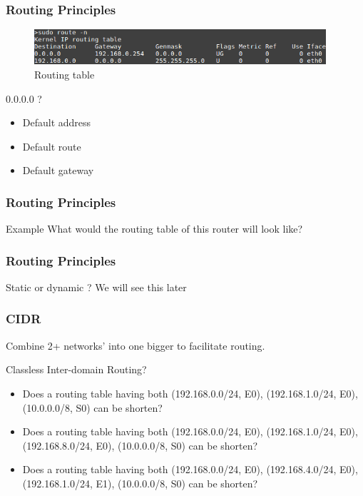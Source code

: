   \begin{frame}
    \frametitle{Routing Principles}
    \begin{figure}[t]
      \centering
      \includegraphics[height=1.3cm]{./imgs/routing-table.png}
      \caption{Routing table}
      \label{fig:routing_table}
    \end{figure}
    \begin{block}{0.0.0.0 ?}
      \begin{itemize}
        \item Default address
        \item Default route
        \item Default gateway
      \end{itemize}
    \end{block}
  \end{frame}

  \begin{frame}
    \frametitle{Routing Principles}
    \begin{block}{Example}
      What would the routing table of this router will look like?
    \end{block}
  \end{frame}

  \begin{frame}
    \frametitle{Routing Principles}
    \begin{block}{Static or dynamic ?} \pause
      We will see this later
    \end{block}
  \end{frame}

  \begin{frame}
    \frametitle{CIDR}
    Combine 2+ networks' into one bigger to facilitate routing.
    \pause
    \begin{block}{Classless Inter-domain Routing?}
      \begin{itemize}
        \item Does a routing table having both (192.168.0.0/24, E0), (192.168.1.0/24, E0), (10.0.0.0/8, S0) can be shorten? \pause
        \item Does a routing table having both (192.168.0.0/24, E0), (192.168.1.0/24, E0), (192.168.8.0/24, E0), (10.0.0.0/8, S0) can be shorten? \pause
        \item Does a routing table having both (192.168.0.0/24, E0), (192.168.4.0/24, E0), (192.168.1.0/24, E1), (10.0.0.0/8, S0) can be shorten?
      \end{itemize}
    \end{block}
  \end{frame}

